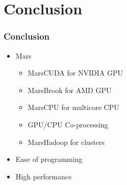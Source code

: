 \section{Conclusion}
\begin{frame}
\frametitle{Conclusion}
\begin{itemize}
\item Mars
\begin{itemize}
\item MarsCUDA for NVIDIA GPU
\item MarsBrook for AMD GPU
\item MarsCPU for multicore CPU
\item GPU/CPU Co-processing
\item MarsHadoop for clusters
\end{itemize}
\item Ease of programming
\item High performance
\end{itemize}
\end{frame}
